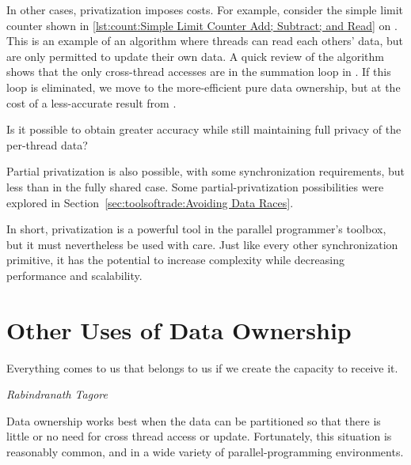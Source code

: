 In other cases, privatization imposes costs.
For example, consider the simple limit counter shown in
\cref{lst:count:Simple Limit Counter Add; Subtract; and Read} on
.
This is an example of an algorithm where threads can read each others'
data, but are only permitted to update their own data.
A quick review of the algorithm shows that the only cross-thread
accesses are in the summation loop in .
If this loop is eliminated, we move to the more-efficient pure
data ownership, but at the cost of a less-accurate result
from .

\QuickQuiz{}
	Is it possible to obtain greater accuracy while still
	maintaining full privacy of the per-thread data?
 \QuickQuizEnd

Partial privatization is also possible, with some synchronization
requirements, but less than in the fully shared case.
Some partial-privatization possibilities were explored in
Section~\ref{sec:toolsoftrade:Avoiding Data Races}.

In short, privatization is a powerful tool in the parallel programmer's
toolbox, but it must nevertheless be used with care.
Just like every other synchronization primitive, it has the potential
to increase complexity while decreasing performance and scalability.

\section{Other Uses of Data Ownership}
\label{sec:owned:Other Uses of Data Ownership}
%
\epigraph{Everything comes to us that belongs to us if we create the
	  capacity to receive it.}
	 {\emph{Rabindranath Tagore}}

Data ownership works best when the data can be partitioned so that there
is little or no need for cross thread access or update.
Fortunately, this situation is reasonably common, and in a wide variety
of parallel-programming environments.

